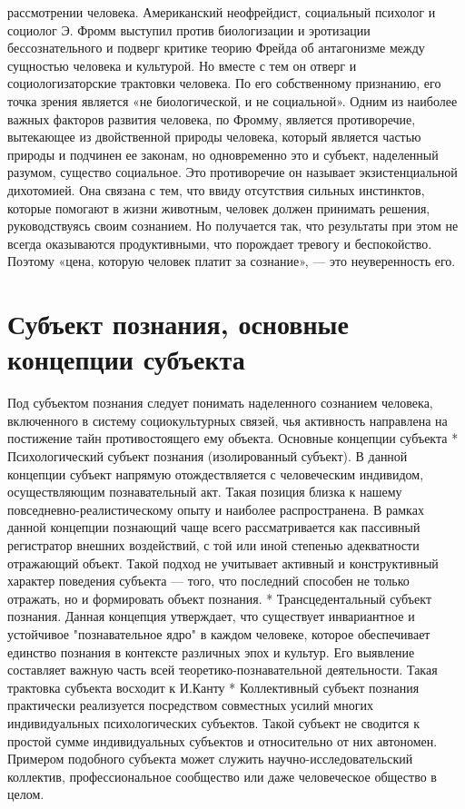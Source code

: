 \documentclass[12pt]{article}
\begin{document}
рассмотрении человека.
Американский неофрейдист, социальный психолог и социолог Э. Фромм выступил против биологизации и
эротизации бессознательного и подверг критике теорию Фрейда об антагонизме между сущностью человека и
культурой.  Но  вместе  с  тем  он  отверг  и  социологизаторские  трактовки  человека.  По  его  собственному
признанию,  его  точка  зрения  является  «не  биологической,  и  не  социальной».  Одним  из  наиболее  важных
факторов  развития  человека,  по  Фромму,  является  противоречие,  вытекающее  из  двойственной  природы
человека,  который  является  частью  природы  и  подчинен  ее  законам,  но  одновременно  это  и  субъект,
наделенный разумом, существо социальное. Это противоречие он называет экзистенциальной дихотомией. Она
связана  с  тем,  что  ввиду  отсутствия  сильных  инстинктов,  которые  помогают  в  жизни  животным,  человек
должен принимать решения, руководствуясь своим сознанием. Но получается так, что результаты при этом не
всегда оказываются продуктивными, что порождает тревогу и беспокойство. Поэтому «цена, которую человек
платит за сознание», — это неуверенность его.

\newpage
\section{Субъект познания, основные концепции субъекта}
Под  субъектом  познания  следует  понимать  наделенного  сознанием  человека,  включенного  в  систему
социокультурных связей, чья активность направлена на постижение тайн противостоящего ему объекта. 
Основные концепции субъекта
   * Психологический субъект познания (изолированный субъект). В данной концепции субъект напрямую
отождествляется с человеческим индивидом, осуществляющим познавательный акт. Такая позиция близка к
нашему  повседневно-реалистическому  опыту  и  наиболее  распространена.  В  рамках  данной  концепции
познающий чаще всего рассматривается как пассивный регистратор внешних воздействий, с той или иной
степенью адекватности отражающий объект. Такой подход не учитывает активный и конструктивный характер
поведения субъекта — того, что последний способен не только отражать, но и формировать объект познания.
   * Трансцедентальный субъект познания. Данная концепция утверждает, что существует инвариантное и
устойчивое "познавательное ядро" в каждом человеке, которое обеспечивает единство познания в контексте
различных  эпох  и  культур.  Его  выявление  составляет  важную  часть  всей  теоретико-познавательной
деятельности. Такая трактовка субъекта восходит к И.Канту
    *  Коллективный  субъект  познания  практически  реализуется  посредством  совместных  усилий  многих
индивидуальных психологических субъектов. Такой субъект не сводится к простой сумме индивидуальных
субъектов  и  относительно  от  них  автономен.  Примером  подобного  субъекта  может  служить  научно-исследовательский коллектив, профессиональное сообщество или даже человеческое общество в целом.
\end{document}
